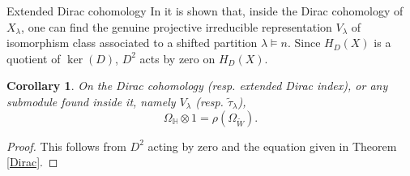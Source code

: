 \documentclass[a4paper,10pt]{amsart}
\newtheorem{corollary}[theorem]{Corollary}
\begin{document}
\begin{section}{Extended Dirac cohomology}
In \cite[5.8]{BCT12} it is shown that, inside the Dirac cohomology of $X_\lambda$, one can find the genuine projective irreducible representation $V_\lambda$ of isomorphism class associated to a shifted partition $\lambda \vDash n$.
Since $H_D(X)$ is a quotient of $\ker(D)$, $D^2$ acts by zero on $H_D(X)$.

\begin{corollary} On the Dirac cohomology (resp. extended Dirac index), or any submodule found inside it, namely $V_\lambda$ (resp. $\tilde{\tau}_\lambda$), 
$$\Omega_\mathbb{H}\otimes 1=  \rho(\Omega_{\tilde{W}}).$$
\end{corollary}
\begin{proof} This follows from $D^2$ acting by zero and the equation given in Theorem \ref{Dirac}.\end{proof}



\end{section}
\end{document}
